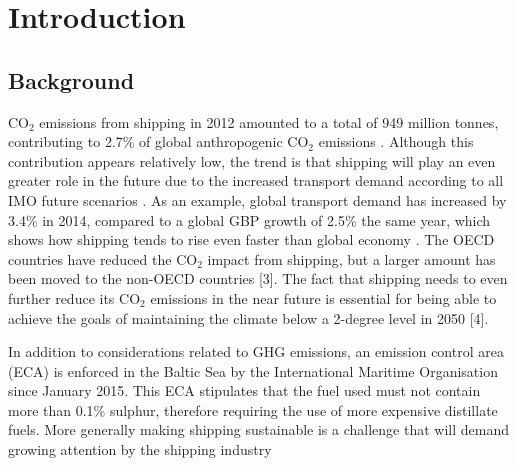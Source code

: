 \documentclass[preprint,12pt]{elsarticle}
\begin{document}






\section{Introduction} \label{sec:introduction}

\subsection{Background}

CO$_2$ emissions from shipping in 2012 amounted to a total of 949 million tonnes, contributing to 2.7\% of global anthropogenic CO$_2$ emissions \cite{Smith2014}. Although this contribution appears relatively low, the trend is that shipping will play an even greater role in the future due to the increased transport demand according to all IMO future scenarios \cite{Smith2014}. As an example, global transport demand has increased by 3.4\% in 2014, compared to a global GBP growth of 2.5\% the same year, which shows how shipping tends to rise even faster than global economy \cite{UNCTAD2015}. The OECD countries have reduced the CO$_2$ impact from shipping, but a larger amount has been moved to the non-OECD countries [3]. The fact that shipping needs to even further reduce its CO$_2$ emissions in the near future is essential for being able to achieve the goals of maintaining the climate below a 2-degree level in 2050 [4]. 

In addition to considerations related to GHG emissions, an emission control area (ECA) is enforced in the Baltic Sea  by the International Maritime Organisation since January 2015. This ECA stipulates that the fuel used must not contain more than 0.1\% sulphur, therefore requiring the use of more expensive distillate fuels. More generally making shipping sustainable is a challenge that will demand growing attention by the shipping industry \cite{Andersson2016}
\end{document}
